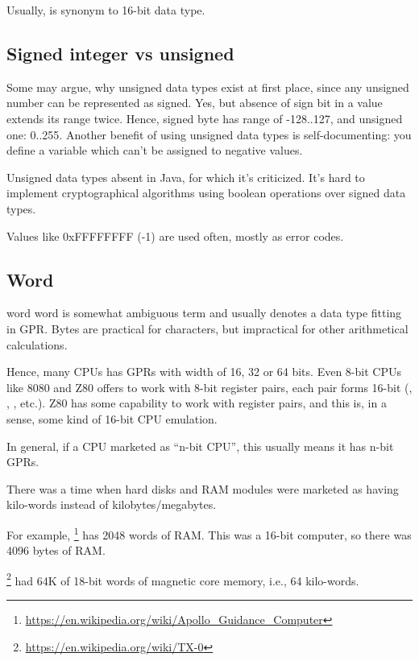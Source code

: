 Usually,  is synonym to 16-bit  data type.

\subsection{Signed integer vs unsigned}

Some may argue, why unsigned data types exist at first place, since any unsigned number can be represented as signed.
Yes, but absence of sign bit in a value extends its range twice.
Hence, signed byte has range of -128..127, and unsigned one: 0..255.
Another benefit of using unsigned data types is self-documenting:
you define a variable which can't be assigned to negative values.

Unsigned data types absent in Java, for which it's criticized.
It's hard to implement cryptographical algorithms using boolean operations over signed data types.

Values like 0xFFFFFFFF (-1) are used often, mostly as error codes.

\subsection{Word}

\Gls{word} word is somewhat ambiguous term and usually denotes a data type fitting in \ac{GPR}.
Bytes are practical for characters, but impractical for other arithmetical calculations.

Hence, many \ac{CPU}s has \ac{GPR}s with width of 16, 32 or 64 bits.
Even 8-bit CPUs like 8080 and Z80 offers to work with 8-bit register pairs, each pair forms 16-bit 
(, , , etc.).
Z80 has some capability to work with register pairs, and this is, in a sense, some kind of 16-bit CPU emulation.

In general, if a CPU marketed as ``n-bit CPU'', this usually means it has n-bit \ac{GPR}s.

There was a time when hard disks and \ac{RAM} modules were marketed as having  kilo-words instead of
 kilobytes/megabytes.

For example, \footnote{\url{https://en.wikipedia.org/wiki/Apollo_Guidance_Computer}}
has 2048 words of \ac{RAM}.
This was a 16-bit computer, so there was 4096 bytes of \ac{RAM}.

\footnote{\url{https://en.wikipedia.org/wiki/TX-0}} had 64K of 18-bit words of magnetic core memory,
i.e., 64 kilo-words.

